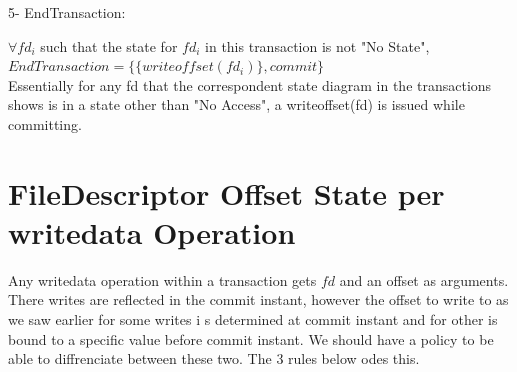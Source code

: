 \documentclass[a4paper, 11pt]{article}
\begin{document}


5- EndTransaction: 

\hspace{8mm} $\forall fd_i$ such that the state for $fd_i$ in this transaction is  not "No State",  $EndTransaction= \{\{{writeoffset(fd_i)}\}, commit\}$\\

Essentially for any fd that the correspondent state diagram in the transactions shows is in a state other than "No Access", a writeoffset(fd) is issued while committing.\\



\section{FileDescriptor Offset State per writedata Operation}

Any writedata operation within a transaction gets $fd$ and an offset as arguments. There writes are reflected in the commit instant, however the offset to write to as we saw earlier for some writes i s determined at commit instant and for other is bound to a specific value before commit instant. We should have a policy to be able to diffrenciate between these two. The 3 rules below odes this.\\
\end{document}
